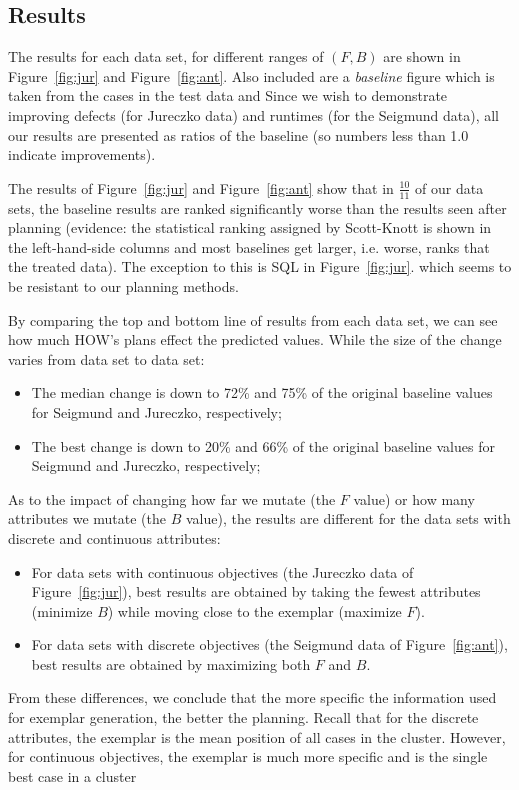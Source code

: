 \documentclass[conference]{IEEEtran}
\newcommand{\bi}{\begin{itemize}}
\newcommand{\ei}{\end{itemize}}
\newcommand{\fig}[1]{Figure~\ref{fig:#1}}
\begin{document}
  
\subsection{Results}
The results for each data set, for different ranges of $(F,B)$ are shown in \fig{jur} and \fig{ant}.
Also included are a {\em baseline} figure which is taken from the cases in the test data
and  Since we wish to demonstrate
improving defects
(for Jureczko data) and runtimes (for the Seigmund data), all our results are presented as ratios of the baseline (so numbers less than 1.0 indicate improvements).

  
 The   results of \fig{jur} and \fig{ant} show that in $\frac{10}{11}$ of our
 data sets, the baseline results are ranked significantly worse than the results seen
 after planning (evidence: the statistical ranking assigned by Scott-Knott is shown in the left-hand-side columns and most baselines get larger, i.e. worse, ranks
 that the treated data). The exception to this is SQL in  \fig{jur}. which
 seems to
 be resistant to our planning methods.
 
 By comparing the top and bottom line of results from each data set, we can see how much HOW's
 plans effect the predicted values. While the  size of the change varies from data set to data set:
 \bi
 \item The median change is down to 72\% and 75\%  of the original baseline values for Seigmund and Jureczko, respectively;
 \item The best change is down to 20\% and 66\% of the original baseline values for Seigmund and Jureczko, respectively;
 \ei
 As to the impact of changing how far we mutate (the $F$ value) or how many attributes
 we mutate (the $B$ value), the results are different for the data sets with discrete and continuous attributes:
 \bi
 \item For data sets with continuous objectives (the Jureczko data of \fig{jur}),
 best results are obtained by taking the fewest attributes (minimize $B$) 
 while moving close to the exemplar (maximize $F$).
 \item For data sets with discrete objectives (the Seigmund data  of \fig{ant}),
 best results are obtained by maximizing both $F$ and $B$.
 \ei
  From these differences, we conclude that the more specific the  information used for exemplar
 generation, the better the planning. Recall that for the discrete
 attributes, the exemplar is the mean position of all cases in the cluster.
 However,  for continuous
 objectives, the exemplar is much more specific and is the  single  best case in a cluster 
\end{document}
